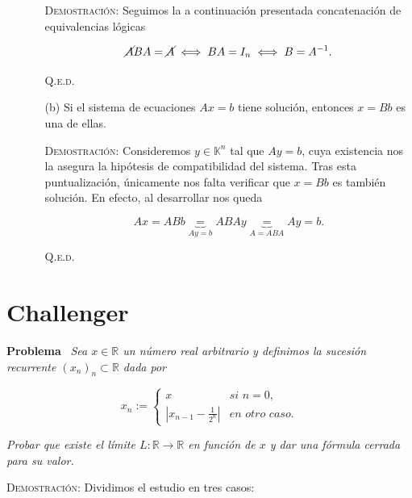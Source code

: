 \documentclass{article}
\begin{document}
\begin{enumerate}
\begin{enumerate}
        \vspace{7px}

        \textsc{Demostración}: Seguimos la a continuación presentada concatenación de equivalencias lógicas

        \[\cancel{A}BA = \cancel{A} \iff BA = I_n \iff B = A^{-1}.\]

        \hfill{\textsc{Q.e.d.}}

        \vspace{7px}

        \item[(b)] Si el sistema de ecuaciones $Ax = b$ tiene solución, entonces $x = Bb$ es una de ellas.
        
        \vspace{7px}

        \textsc{Demostración}: Consideremos $y \in \mathbb{K}^n$ tal que $Ay = b$, cuya existencia nos la asegura la hipótesis de compatibilidad del sistema. Tras esta puntualización, únicamente nos falta verificar que $x = Bb$ es también solución. En efecto, al desarrollar nos queda

        \[Ax = ABb \underbrace{=}_{Ay = b} ABAy \underbrace{=}_{A = ABA} Ay = b.\]

        \hfill{\textsc{Q.e.d.}}
    \end{enumerate}
\end{enumerate}

\newpage

\section{Challenger}

\textbf{Problema} \, \textit{Sea $x \in \mathbb{R}$ un número real arbitrario y definimos la sucesión recurrente $(x_n)_n \subset \mathbb{R}$ dada por}

\[
x_n :=
\begin{cases}
    x & \textit{si $n = 0$,} \\
    \left|x_{n-1} - \frac{1}{2^n}\right| & \textit{en otro caso.}
\end{cases}
\]

\noindent \textit{Probar que existe el límite $L : \mathbb{R} \rightarrow \mathbb{R}$ en función de $x$ y dar una fórmula cerrada para su valor.}

\vspace{7px}

\noindent\textsc{Demostración}: Dividimos el estudio en tres casos:
\end{document}
